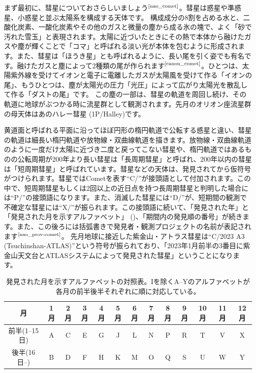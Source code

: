 \documentclass[../../super_nova_2024]{subfiles}
\begin{document}
まず最初に、彗星についておさらしいましょう$^\text{\cite{nao_comet}}$。彗星は惑星や準惑星、小惑星と並ぶ太陽系を構成する天体です。
構成成分の8割を占める水と、二酸化炭素、一酸化炭素やその他のガスと微量の塵から成る氷の塊で、よく「砂で汚れた雪玉」と表現されます。太陽に近づいたときにその熱で本体から融けたガスや塵が輝くことで「コマ」と呼ばれる淡い光が本体を包むように形成されます。また、彗星は「ほうき星」とも呼ばれるように、長い尾を引く姿でも有名です。融けたガスと塵によって2種類の尾が作られます$^\text{\cite{canon_comet}}$。ひとつは、太陽紫外線を受けてイオンと電子に電離したガスが太陽風を受けて作る「イオンの尾」、もうひとつは、塵が太陽光の圧力「光圧」によって広がり太陽光を散乱して作る「ダストの尾」です。
この塵の一部は、彗星の軌道を周回し続け、その軌道に地球がぶつかる時に流星群として観測されます。先月のオリオン座流星群の母天体はあのハレー彗星 (1P/Halley)です。

黄道面と呼ばれる平面に沿ってほぼ円形の楕円軌道で公転する惑星と違い、彗星の軌道は細長い楕円軌道や放物線・双曲線軌道を描きます。放物線・双曲線軌道のように一度だけ太陽に近づき二度と戻ってこない彗星や、楕円軌道ではあるものの公転周期が200年より長い彗星は「長周期彗星」と呼ばれ、200年以内の彗星は「短周期彗星」と呼ばれています。彗星などの天体は、発見されてから仮符号がつけられます。彗星ではCometを表す``C/''が接頭語として付加されます。この中で、短周期彗星もしくは2回以上の近日点を持つ長周期彗星と判明した場合には``P/''の接頭語になります。また、消滅した彗星には``D/''が、短期間の観測で不確定な彗星には``X/''が振られます。この接頭語に続いて、「発見された年」と「発見された月を示すアルファベット」 ()、「期間内の発見順の番号」が続きます。また、この後ろには括弧書きで発見者・観測プロジェクトの名前が表記されます$^\text{\cite{nao_prov-comet}}$。
先月地球に接近した紫金山・アトラス彗星は``C/2023 A3 (Tsuchinshan-ATLAS)''という符号が振られており、「2023年1月前半の3番目に紫金山天文台とATLASシステムによって発見された彗星」ということになります。

\begin{table}
    \centering
    \caption{発見された月を示すアルファベットの対照表。Iを除くA--Yのアルファベットが各月の前半後半それぞれに順に対応している。}
    \label{tab:alphabet}
    \begin{tabular}{c|cccccccccccc}\hline
        月 & 1月 & 2月 & 3月 & 4月 & 5月 & 6月 & 7月 & 8月 & 9月 & 10月 & 11月 & 12月 \\
        \hline
        前半(1--15日) & A & C & E & G & J & L & N & P & R & T & V & X \\
        後半(16日--) & B & D & F & H & K & M & O & Q & S & U & W & Y \\
        \hline
    \end{tabular}
\end{table}
\end{document}
